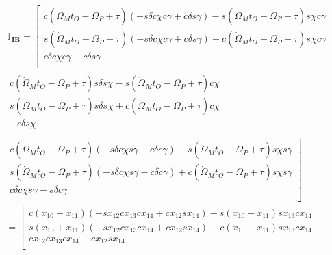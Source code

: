 \begin{multline} \label{eq:IBtrans}
\mathbb{T}_{\mathbf{IB}}=
\left[
\begin{matrix}
c\left(\dot{\Omega}_{M}t_{O}-\Omega_{P}+\tau\right)\left(-s\delta c\chi c\gamma +c\delta s\gamma \right)-s\left(\dot{\Omega}_{M}t_{O}-\Omega_{P}+\tau\right) s\chi c\gamma    \\
s\left(\dot{\Omega}_{M}t_{O}-\Omega_{P}+\tau\right)\left(-s\delta c\chi c\gamma +c\delta s\gamma \right)+c\left(\dot{\Omega}_{M}t_{O}-\Omega_{P}+\tau\right) s\chi c\gamma   \\
c\delta c\chi c\gamma -c\delta s\gamma    \\
\end{matrix}  \right.
\\
\begin{matrix}
c\left(\dot{\Omega}_{M}t_{O}-\Omega_{P}+\tau\right) s\delta s\chi -s\left(\dot{\Omega}_{M}t_{O}-\Omega_{P}+\tau\right) c\chi\\
s\left(\dot{\Omega}_{M}t_{O}-\Omega_{P}+\tau\right) s\delta s\chi +c\left(\dot{\Omega}_{M}t_{O}-\Omega_{P}+\tau\right) c\chi \\
 -c\delta s\chi \\
\end{matrix}
\\
\left.
\begin{matrix}
c\left(\dot{\Omega}_{M}t_{O}-\Omega_{P}+\tau\right)\left(-s\delta c\chi s\gamma -c\delta c\gamma \right)-s\left(\dot{\Omega}_{M}t_{O}-\Omega_{P}+\tau\right) s\chi s\gamma\\
s\left(\dot{\Omega}_{M}t_{O}-\Omega_{P}+\tau\right)\left(-s\delta c\chi s\gamma -c\delta c\gamma \right)+c\left(\dot{\Omega}_{M}t_{O}-\Omega_{P}+\tau\right) s\chi s\gamma \\
c\delta c\chi s\gamma -s\delta c\gamma\\
\end{matrix}
\right]\\
=
\left[
\begin{matrix}
c\left(x_{10}+x_{11}\right)\left(-sx_{12} cx_{13} cx_{14} +cx_{12} sx_{14} \right)-s\left(x_{10}+x_{11}\right) sx_{13} cx_{14}    \\
s\left(x_{10}+x_{11}\right)\left(-sx_{12} cx_{13} cx_{14} +cx_{12} sx_{14} \right)+c\left(x_{10}+x_{11}\right) sx_{13} cx_{14}    \\
cx_{12} cx_{13} cx_{14} -cx_{12} sx_{14}   \\
\end{matrix} \right.
\\

\end{multline}
